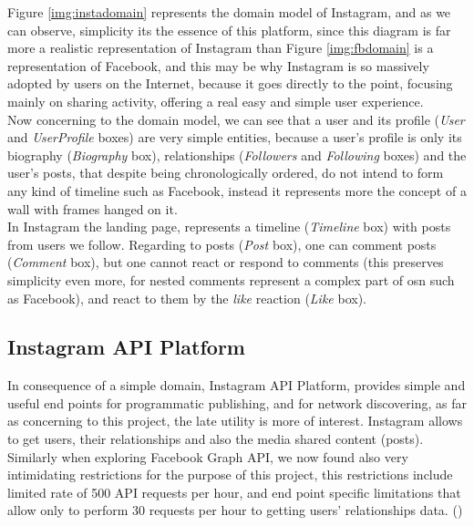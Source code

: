 Figure \ref{img:instadomain} represents the domain model of Instagram, and as we can observe, simplicity its the essence of this platform, since this diagram is far
more a realistic representation of Instagram than Figure \ref{img:fbdomain} is a representation of Facebook, and this may be why Instagram is so massively adopted by users
on the Internet, because it goes directly to the point, focusing mainly on sharing activity, offering a real easy and simple user experience.\\
\indent Now concerning to the domain model, we can see that a user and its profile (\textit{User} and \textit{UserProfile} boxes) are very simple entities, because
a user's profile is only its biography (\textit{Biography} box), relationships (\textit{Followers} and \textit{Following} boxes) and the user's posts, that despite
being chronologically ordered, do not intend to form any kind of timeline such as Facebook, instead it represents more the concept of a wall with frames hanged on it.\\
\indent In Instagram the landing page, represents a timeline (\textit{Timeline} box) with posts from users we follow. Regarding to posts (\textit{Post} box), one can
comment posts (\textit{Comment} box), but one cannot react or respond to comments (this preserves simplicity even more, for nested comments represent
 a complex part of \gls{osn} such as Facebook), and react to them by the \textit{like} reaction (\textit{Like} box).

\subsection*{Instagram API Platform}
In consequence of a simple domain, Instagram API Platform, provides simple and useful
end points for programmatic publishing, and for network discovering, as far as concerning to this project, the late utility
is more of interest. Instagram allows to get users, their relationships and also the media shared content (posts).\\
\indent Similarly when exploring Facebook Graph API, we now found also very intimidating restrictions for the purpose of this project,
this restrictions include limited rate of 500 API requests per hour, and end point specific limitations that allow only to
perform 30 requests per hour to getting users' relationships data. (\cite{instadev})

